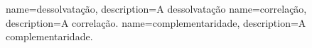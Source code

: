  {
		name={dessolvatação}, 
	description={A dessolvatação}
}
 {
	name={correlação}, 
	description={A correlação.}
}
 {
	name={complementaridade}, 
	description={A complementaridade.}
}

\glsaddall